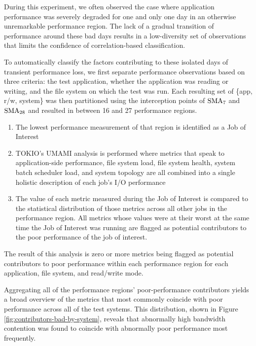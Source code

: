 During this experiment, we often observed the case where application performance was severely degraded for one and only one day in an otherwise unremarkable performance region.  
The lack of a gradual transition of performance around these bad days results in a low-diversity set of observations that limits the confidence of correlation-based classification.

To automatically classify the factors contributing to these isolated days of transient performance loss, we first separate performance observations based on three criteria: the test application, whether the application was reading or writing, and the file system on which the test was run.
Each resulting set of \{app, r/w, system\} was then partitioned using the interception points of $\textup{SMA}_{7}$ and $\textup{SMA}_{28}$ and resulted in between 16 and 27 performance regions.


\begin{enumerate}[leftmargin=*]
\item The lowest performance measurement of that region is identified as a Job of Interest
\item TOKIO's UMAMI analysis is performed where metrics that speak to application-side performance, file system load, file system health, system batch scheduler load, and system topology are all combined into a single holistic description of each job's I/O performance
\item The value of each metric measured during the Job of Interest is compared to the statistical distribution of those metrics across all other jobs in the performance region.  All metrics whose values were at their worst at the same time the Job of Interest was running are flagged as potential contributors to the poor performance of the job of interest.
\end{enumerate}

The result of this analysis is zero or more metrics being flagged as potential contributors to poor performance within each performance region for each application, file system, and read/write mode.

Aggregating all of the performance regions' poor-performance contributors yields a broad overview of the metrics that most commonly coincide with poor performance across all of the test systems.
This distribution, shown in Figure \ref{fig:contributors-bad-by-system}, reveals that abnormally high bandwidth contention was found to coincide with abnormally poor performance most frequently.


